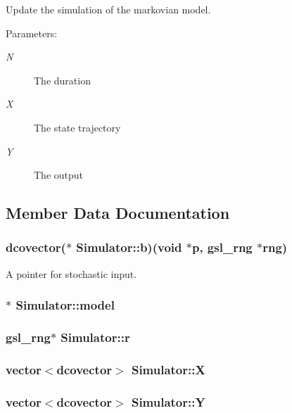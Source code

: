 Update the simulation of the markovian model. 

\begin{Desc}
\item[Parameters:]
\begin{description}
\item[{\em N}]The duration \item[{\em X}]The state trajectory \item[{\em Y}]The output \end{description}
\end{Desc}


\subsection{Member Data Documentation}
\hypertarget{class_simulator_b5b842f75497c70ddb2edcaa5f731506}{
\subsubsection[{b}]{\setlength{\rightskip}{0pt plus 5cm}dcovector($\ast$ {\bf Simulator::b})(void $\ast$p, gsl\_\-rng $\ast$rng)}}
\label{class_simulator_b5b842f75497c70ddb2edcaa5f731506}


A pointer for stochastic input. 

\hypertarget{class_simulator_ab8f86e4e70af8f5a1a6c885e03d9bed}{
\subsubsection[{model}]{$\ast$ {\bf Simulator::model}}}
\label{class_simulator_ab8f86e4e70af8f5a1a6c885e03d9bed}


\hypertarget{class_simulator_9e44f21a53c12fb2da041531c41dae8e}{
\subsubsection[{r}]{\setlength{\rightskip}{0pt plus 5cm}gsl\_\-rng$\ast$ {\bf Simulator::r}}}
\label{class_simulator_9e44f21a53c12fb2da041531c41dae8e}


\hypertarget{class_simulator_a2db8ace19099d996be516022d230bc0}{
\subsubsection[{X}]{\setlength{\rightskip}{0pt plus 5cm}vector$<$dcovector$>$ {\bf Simulator::X}}}
\label{class_simulator_a2db8ace19099d996be516022d230bc0}


\hypertarget{class_simulator_403a127c909abf3e4c6d48a287315987}{
\subsubsection[{Y}]{\setlength{\rightskip}{0pt plus 5cm}vector$<$dcovector$>$ {\bf Simulator::Y}}}
\label{class_simulator_403a127c909abf3e4c6d48a287315987}


